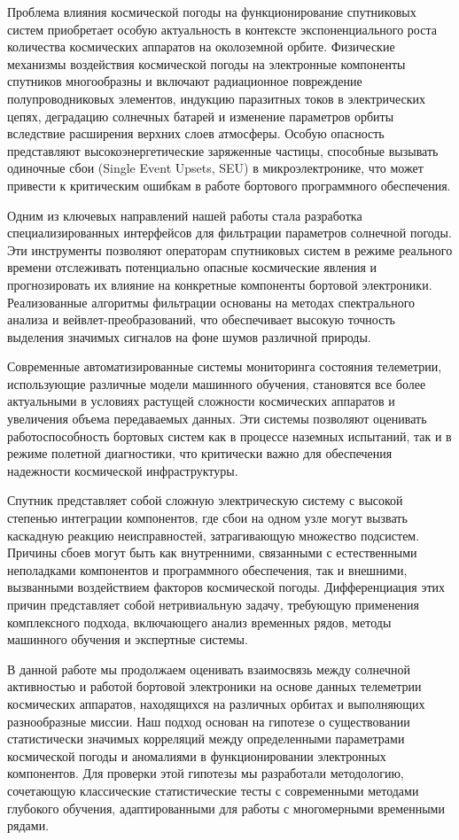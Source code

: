 
Проблема влияния космической погоды на функционирование спутниковых систем
приобретает особую актуальность в контексте экспоненциального роста количества
космических аппаратов на околоземной орбите.
Физические механизмы воздействия космической погоды на электронные компоненты
спутников многообразны и включают радиационное повреждение полупроводниковых
элементов, индукцию паразитных токов в электрических цепях, деградацию солнечных
батарей и изменение параметров орбиты вследствие расширения верхних слоев
атмосферы. Особую опасность представляют высокоэнергетические заряженные
частицы, способные вызывать одиночные сбои (Single Event Upsets, SEU) в
микроэлектронике, что может привести к критическим ошибкам в работе бортового
программного обеспечения.

Одним из ключевых направлений нашей работы стала разработка специализированных
интерфейсов для фильтрации параметров солнечной погоды. Эти инструменты
позволяют операторам спутниковых систем в режиме реального времени отслеживать
потенциально опасные космические явления и прогнозировать их влияние на
конкретные компоненты бортовой электроники. Реализованные алгоритмы фильтрации
основаны на методах спектрального анализа и вейвлет-преобразований, что
обеспечивает высокую точность выделения значимых сигналов на фоне шумов
различной природы.

Современные автоматизированные системы мониторинга состояния телеметрии,
использующие различные модели машинного обучения, становятся все более
актуальными в условиях растущей сложности космических аппаратов и увеличения
объема передаваемых данных. Эти системы позволяют оценивать работоспособность
бортовых систем как в процессе наземных испытаний, так и в режиме полетной
диагностики, что критически важно для обеспечения надежности космической
инфраструктуры.

Спутник представляет собой сложную электрическую систему с высокой степенью
интеграции компонентов, где сбои на одном узле могут вызвать каскадную реакцию
неисправностей, затрагивающую множество подсистем. Причины сбоев могут быть как
внутренними, связанными с естественными неполадками компонентов и программного
обеспечения, так и внешними, вызванными воздействием факторов космической
погоды. Дифференциация этих причин представляет собой нетривиальную задачу,
требующую применения комплексного подхода, включающего анализ временных рядов,
методы машинного обучения и экспертные системы.

В данной работе мы продолжаем оценивать взаимосвязь между солнечной активностью
и работой бортовой электроники на основе данных телеметрии космических
аппаратов, находящихся на различных орбитах и выполняющих разнообразные миссии.
Наш подход основан на гипотезе о существовании статистически значимых корреляций
между определенными параметрами космической погоды и аномалиями в
функционировании электронных компонентов. Для проверки этой гипотезы мы
разработали методологию, сочетающую классические статистические тесты с
современными методами глубокого обучения, адаптированными для работы с
многомерными временными рядами.

